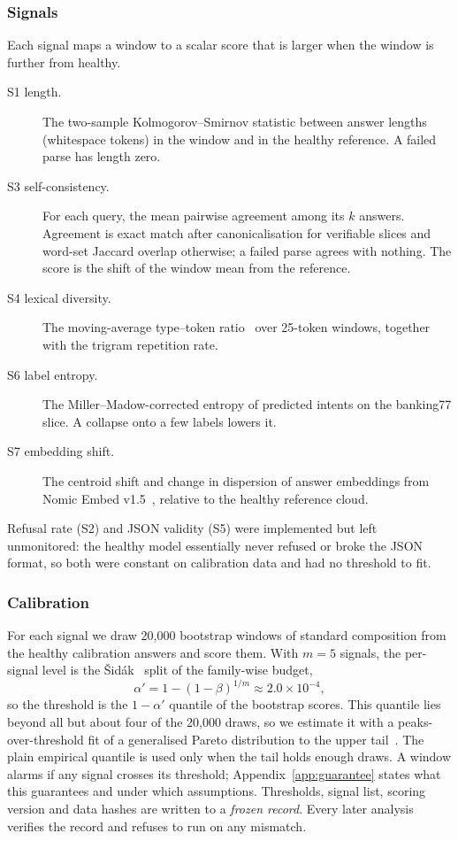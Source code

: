 \documentclass{article}
\begin{document}
\subsubsection{Signals}
Each signal maps a window to a scalar score that is larger when the window is
further from healthy.
\begin{description}
  \item[S1 length.] The two-sample Kolmogorov--Smirnov statistic between answer
  lengths (whitespace tokens) in the window and in the healthy reference. A failed
  parse has length zero.
  \item[S3 self-consistency.] For each query, the mean pairwise agreement among
  its $k$ answers. Agreement is exact match after canonicalisation for verifiable
  slices and word-set Jaccard overlap otherwise; a failed parse agrees with
  nothing. The score is the shift of the window mean from the reference.
  \item[S4 lexical diversity.] The moving-average type--token
  ratio~\citep{covington2010mattr} over 25-token windows, together with the
  trigram repetition rate.
  \item[S6 label entropy.] The Miller--Madow-corrected entropy of predicted
  intents on the banking77 slice. A collapse onto a few labels lowers it.
  \item[S7 embedding shift.] The centroid shift and change in dispersion of
  answer embeddings from Nomic Embed v1.5~\citep{nussbaum2024nomic},
  relative to the healthy reference cloud.
\end{description}
Refusal rate (S2) and JSON validity (S5) were implemented but left unmonitored:
the healthy model essentially never refused or broke the JSON format, so both
were constant on calibration data and had no threshold to fit.

\subsubsection{Calibration}
For each signal we draw 20{,}000 bootstrap windows of standard composition from
the healthy calibration answers and score them. With $m=5$ signals, the per-signal
level is the Šidák~\citep{sidak1967rectangular} split of the family-wise budget,
\[
  \alpha' = 1-(1-\beta)^{1/m} \approx 2.0\times10^{-4},
\]
so the threshold is the $1-\alpha'$ quantile of the bootstrap scores. This quantile
lies beyond all but about four of the 20{,}000 draws, so we estimate it with a
peaks-over-threshold fit of a generalised Pareto distribution to the upper
tail~\citep{pickands1975statistical}. The plain empirical quantile is used only
when the tail holds enough draws. A window alarms if any signal crosses its
threshold; Appendix~\ref{app:guarantee} states what this guarantees and under which
assumptions. Thresholds, signal list, scoring version and data hashes are written to
a \emph{frozen record}. Every later analysis verifies the record and refuses to run
on any mismatch.
\end{document}
